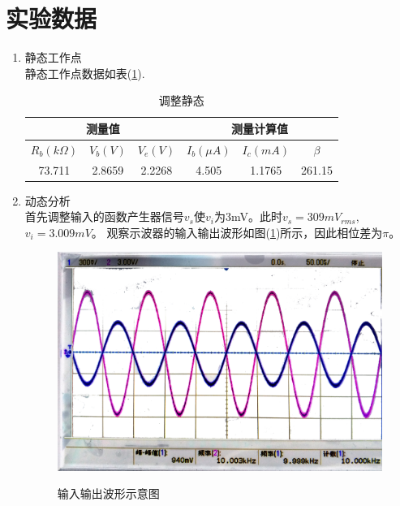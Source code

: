 \documentclass[a4paper]{article}
\begin{document}
\section{实验数据}
\begin{enumerate}
\item 静态工作点\\
静态工作点数据如表(\ref{table1}).
\begin{table}[!h]
\centering
\caption{调整静态}
\label{table1}
\begin{tabular}{c|c|c|c|c|c}
\hline
\multicolumn{3}{c|}{测量值}             & \multicolumn{3}{c}{测量计算值}         \\ \hline
$R_b(k\Omega)$ & $V_b(V)$ & $V_e(V)$ & $I_b(\mu A)$ & $I_c(mA)$ & $\beta$ \\ \hline
73.711                  & 2.8659     & 2.2268     & 4.505             & 1.1765       & 261.15        \\ \hline
\end{tabular}
\end{table}
\item 动态分析\\
首先调整输入的函数产生器信号$v_s$使$v_i$为3mV。此时$v_s = 309 mV_{rms}$, $v_i = 3.009 mV$。
观察示波器的输入输出波形如图(\ref{wf})所示，因此相位差为$\pi$。
\begin{figure}[!h]
\centering
\includegraphics[width=12cm]{fig/waveform.jpg}\\
\caption{输入输出波形示意图}\label{wf}
\end{figure}


\end{enumerate}
\end{document}
